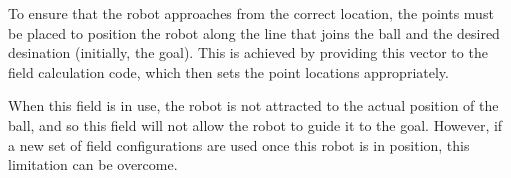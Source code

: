 \documentclass[10pt]{article}
\begin{document}
\begin{figure}
\end{figure}

To ensure that the robot approaches from the correct location, the points must
be placed to position the robot along the line that joins the ball and the
desired desination (initially, the goal).  This is achieved by providing this
vector to the field calculation code, which then sets the point locations
appropriately.

When this field is in use, the robot is not attracted to the actual position of
the ball, and so this field will not allow the robot to guide it to the goal.
However, if a new set of field configurations are used once this robot is in
position, this limitation can be overcome.
\end{document}
